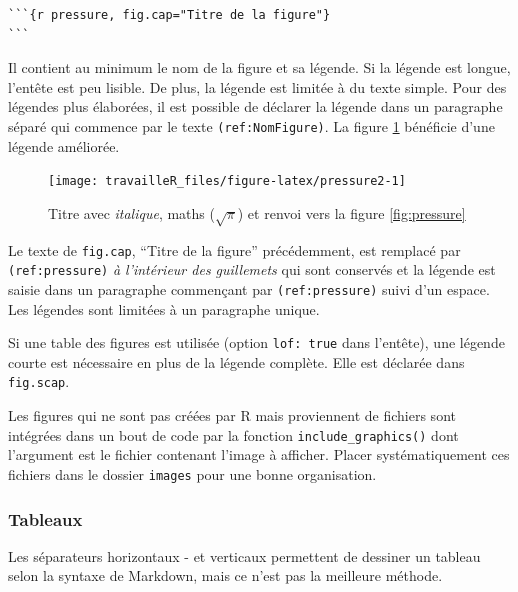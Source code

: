 \documentclass[
  12pt,
  french,
  a4paper,
  extrafontsizes,onecolumn,openright
  ]{memoir}
\begin{document}
\begin{verbatim}
```{r pressure, fig.cap="Titre de la figure"}
```
\end{verbatim}

Il contient au minimum le nom de la figure et sa légende.
Si la légende est longue, l'entête est peu lisible.
De plus, la légende est limitée à du texte simple.
Pour des légendes plus élaborées, il est possible de déclarer la légende dans un paragraphe séparé qui commence par le texte \texttt{(ref:NomFigure)}.
La figure \ref{fig:pressure2} bénéficie d'une légende améliorée.



\scriptsize

\begin{figure}

{\centering \texttt{[image: travailleR\_files/figure-latex/pressure2-1]} 

}

\caption{Titre avec \emph{italique}, maths (\(\sqrt\pi\)) et renvoi vers la figure \ref{fig:pressure}}\label{fig:pressure2}
\end{figure}

\normalsize

Le texte de \texttt{fig.cap}, \enquote{Titre de la figure} précédemment, est remplacé par \texttt{(ref:pressure)} \emph{à l'intérieur des guillemets} qui sont conservés et la légende est saisie dans un paragraphe commençant par \texttt{(ref:pressure)} suivi d'un espace.
Les légendes sont limitées à un paragraphe unique.

Si une table des figures est utilisée (option \texttt{lof:\ true} dans l'entête), une légende courte est nécessaire en plus de la légende complète.
Elle est déclarée dans \texttt{fig.scap}.

Les figures qui ne sont pas créées par R mais proviennent de fichiers sont intégrées dans un bout de code par la fonction \texttt{include\_graphics()} dont l'argument est le fichier contenant l'image à afficher.
Placer systématiquement ces fichiers dans le dossier \texttt{images} pour une bonne organisation.

\subsubsection{Tableaux}\label{tableaux}

Les séparateurs horizontaux - et verticaux \textbar{} permettent de dessiner un tableau selon la syntaxe de Markdown, mais ce n'est pas la meilleure méthode.
\end{document}
